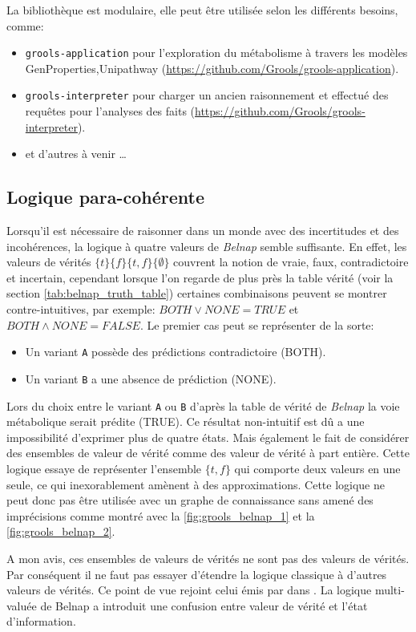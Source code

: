 \begin{refsegment}
La bibliothèque est modulaire, elle peut être utilisée selon les différents besoins, comme:\nolisttopbreak
\begin{itemize}
	\item \texttt{grools-application} pour l'exploration du métabolisme à travers les modèles GenProperties,Unipathway  (\url{https://github.com/Grools/grools-application}).
	\item \texttt{grools-interpreter} pour charger un ancien raisonnement et effectué des requêtes pour l'analyses des faits (\url{https://github.com/Grools/grools-interpreter}).
	\item et d'autres à venir \ldots
\end{itemize}

\subsection{Logique para-cohérente}
Lorsqu'il est nécessaire de raisonner dans un monde avec des incertitudes et des incohérences, la logique à quatre valeurs de \textit{Belnap} semble suffisante. En effet, les valeurs de vérités $\{t\} \{f\} \{t,f\} \{\emptyset\}$ couvrent la notion de vraie, faux, contradictoire et incertain, cependant lorsque l'on regarde de plus près la table vérité  (voir la section   \cref{tab:belnap_truth_table}) certaines combinaisons peuvent se montrer contre-intuitives, par exemple: $ BOTH \lor  NONE = TRUE$ et $ BOTH \land NONE = FALSE$. Le premier cas  peut se représenter de la sorte: 
\begin{itemize}
    \item Un variant \texttt{A} possède des prédictions contradictoire (BOTH).
    \item Un variant \texttt{B} a une absence de prédiction (NONE).
\end{itemize}
Lors du choix entre le variant \texttt{A} ou \texttt{B} d'après la table de vérité de \textit{Belnap} la voie métabolique serait prédite (TRUE). Ce résultat non-intuitif est dû a une impossibilité d'exprimer plus de quatre états. Mais également le fait de considérer des ensembles de valeur de vérité comme des valeur de vérité à part entière. Cette logique essaye de représenter l'ensemble $\{t,f\}$ qui comporte deux valeurs en une seule, ce qui inexorablement amènent à des approximations. Cette logique ne peut donc pas être utilisée avec un graphe de connaissance sans amené des  imprécisions comme montré avec la \cref{fig:grools_belnap_1} et la  \cref{fig:grools_belnap_2}. 

A mon avis, ces ensembles de valeurs de vérités ne sont pas des valeurs de vérités. Par conséquent il ne faut pas essayer d'étendre la logique classique à d'autres valeurs de vérités. Ce point de vue rejoint celui émis par \citeauthor{dubois2008ignorance} dans \cite{dubois2008ignorance}. La logique multi-valuée de Belnap a introduit une confusion entre valeur de vérité et l'état d'information.



\subbibliography
\end{refsegment}